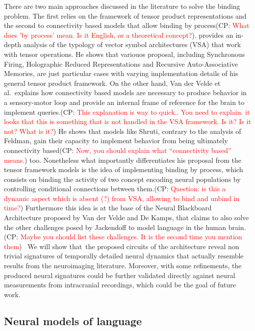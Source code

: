 \documentclass[10pt]{article}
\newcommand{\noteCP}[1]{(CP: \textcolor{red}{#1})}
\begin{document}
There are two main approaches discussed in the literature to solve the
binding problem. The first relies on the framework of tensor product
representations and the second to connectivity based models that allow
binding by process\noteCP{What does 'by process' mean. Is it English,
  or a theoretical concept?}. \cite{smolensky2006harmonic} provides an
in-depth analysis of the typology of vector symbol architectures (VSA)
that work with tensor operations. He shows that variouos proposal,
including Synchronous Firing\cite{Shastri_1993}, Holographic Reduced
Representations\cite{Plate_1995} and Recursive Auto-Associative
Memories\cite{Chalmers_1992}, are just particular cases with varying
implementation details of his general tensor product framework. On the
other hand, Van der Velde et al.\cite{van_der_Velde_2015}~explains how
connectivity based models are necessary to produce behavior in a
sensory-motor loop and provide an internal frame of reference for the
brain to implement queries.\noteCP{This explanation is way to quick..
  You need to explain. it looks that this is something that is not
  handled in the VSA framework. Is it? Is it not? What is it?} He
shows that models like Shruti\cite{Shastri_1993}, contrary to the
analysis of Feldman\cite{Feldman_2012}, gain their capacity to
implement behavior from being ultimately connectivity
based\noteCP{Now, you should explain what ``connectivity based''
  means.} too. Nonetheless what importantly differentiates his
proposal from the tensor framework models is the idea of implementing
binding by process, which consists on binding the activity of two
concept encoding neural populations by controlling conditional
connections between them.\noteCP{Question: is this a dynamic aspect
  which is absent (?) from VSA, allowing to bind and unbind in time?}
Furthermore this idea is at the base of the Neural Blackboard
Architecture proposed by Van der Velde and De
Kamps\cite{van_der_Velde_2006}, that claims to also solve the other
challenges posed by Jackendoff to model language in the human
brain.\noteCP{Maybe you should list these challenges. It is the second
  time you mention them}  We will show that~the proposed circuits of
the architecture reveal non trivial signatures of temporally detailed
neural dynamics that actually resemble results from the neuroimaging
literature. Moreover, with some refinements, the produced neural
signatures could be further validated directly against neural
measurements from intracranial recordings, which could be the goal of
future work.

\subsection{Neural models of language}
\end{document}
